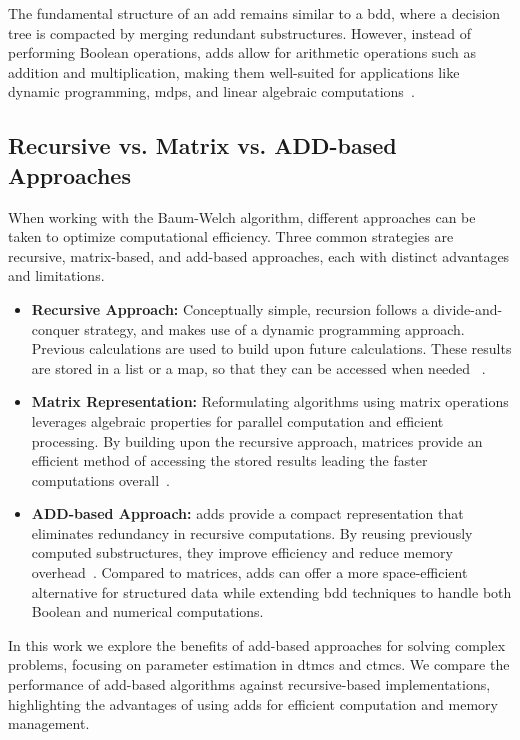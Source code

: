 The fundamental structure of an \gls{add} remains similar to a \gls{bdd}, where a decision tree is compacted by merging redundant substructures.
However, instead of performing Boolean operations, \glspl{add} allow for arithmetic operations such as addition and multiplication, making them well-suited for applications like dynamic programming, \glspl{mdp}, and linear algebraic computations~\cite{bahar1997algebric}.

\subsection{Recursive vs. Matrix vs. ADD-based Approaches}\label{subsec:approaches}
When working with the Baum-Welch algorithm, different approaches can be taken to optimize computational efficiency.
Three common strategies are recursive, matrix-based, and \gls{add}-based approaches, each with distinct advantages and limitations.
\begin{itemize}
    \item \textbf{Recursive Approach:} Conceptually simple, recursion follows a divide-and-conquer strategy, and makes use of a dynamic programming approach. Previous calculations are used to build upon future calculations. These results are stored in a list or a map, so that they can be accessed when needed ~\cite[Chapter 4]{cormen2022introduction}.
    \item \textbf{Matrix Representation:} Reformulating algorithms using matrix operations leverages algebraic properties for parallel computation and efficient processing.
          By building upon the recursive approach, matrices provide an efficient method of accessing the stored results leading the faster computations overall~\cite[Chapter 4, 15 \& 28]{cormen2022introduction}.
    \item \textbf{ADD-based Approach:} \glspl{add} provide a compact representation that eliminates redundancy in recursive computations.
          By reusing previously computed substructures, they improve efficiency and reduce memory overhead~\cite{bahar1997algebric}.
          Compared to matrices, \glspl{add} can offer a more space-efficient alternative for structured data while extending \gls{bdd} techniques to handle both Boolean and numerical computations.
\end{itemize}

In this work we explore the benefits of \gls{add}-based approaches for solving complex problems, focusing on parameter estimation in \glspl{dtmc} and \glspl{ctmc}.
We compare the performance of \gls{add}-based algorithms against recursive-based implementations, highlighting the advantages of using \glspl{add} for efficient computation and memory management.

